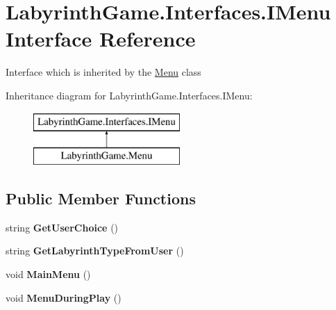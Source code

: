 \hypertarget{interface_labyrinth_game_1_1_interfaces_1_1_i_menu}{\section{Labyrinth\+Game.\+Interfaces.\+I\+Menu Interface Reference}
\label{interface_labyrinth_game_1_1_interfaces_1_1_i_menu}
}


Interface which is inherited by the \hyperlink{class_labyrinth_game_1_1_menu}{Menu} class  


Inheritance diagram for Labyrinth\+Game.\+Interfaces.\+I\+Menu\+:\begin{figure}[H]
\begin{center}
\leavevmode
\includegraphics[height=2.000000cm]{interface_labyrinth_game_1_1_interfaces_1_1_i_menu}
\end{center}
\end{figure}
\subsection*{Public Member Functions}
\begin{DoxyCompactItemize}
\item 
\hypertarget{interface_labyrinth_game_1_1_interfaces_1_1_i_menu_a603775084a102a188f3daa186c66d4ef}{string {\bfseries Get\+User\+Choice} ()}\label{interface_labyrinth_game_1_1_interfaces_1_1_i_menu_a603775084a102a188f3daa186c66d4ef}

\item 
\hypertarget{interface_labyrinth_game_1_1_interfaces_1_1_i_menu_ad4f4a4a4c1c42c2b393bcd3a1e0cf6a3}{string {\bfseries Get\+Labyrinth\+Type\+From\+User} ()}\label{interface_labyrinth_game_1_1_interfaces_1_1_i_menu_ad4f4a4a4c1c42c2b393bcd3a1e0cf6a3}

\item 
\hypertarget{interface_labyrinth_game_1_1_interfaces_1_1_i_menu_ab30cce6440656cd63ab3e614c9450859}{void {\bfseries Main\+Menu} ()}\label{interface_labyrinth_game_1_1_interfaces_1_1_i_menu_ab30cce6440656cd63ab3e614c9450859}

\item 
\hypertarget{interface_labyrinth_game_1_1_interfaces_1_1_i_menu_a5c6b9028f1c5e6b0f0c59278bf877cab}{void {\bfseries Menu\+During\+Play} ()}\label{interface_labyrinth_game_1_1_interfaces_1_1_i_menu_a5c6b9028f1c5e6b0f0c59278bf877cab}

\end{DoxyCompactItemize}


